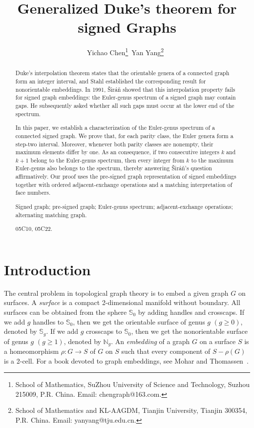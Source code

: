 \documentclass[12pt]{article}
\theoremstyle{definition}
\begin{document}
\title{Generalized Duke's theorem for signed Graphs}

\author{Yichao Chen\thanks{School of Mathematics, SuZhou University of Science and Technology, Suzhou 215009, P.R. China. Email: chengraph@163.com.}\,
\qquad
Yan Yang\thanks{School of Mathematics and KL-AAGDM, Tianjin University, Tianjin 300354, P.R. China. Email: yanyang@tju.edu.cn.} \,}

\date{}

\maketitle

 \begin{abstract}
Duke's interpolation theorem states that the orientable genera of a connected graph form an integer interval, and Stahl established the corresponding result for nonorientable embeddings. In 1991, \v{S}ir\'a\v{n} showed that this interpolation property fails for signed graph embeddings: the Euler-genus spectrum of a signed graph may contain gaps. He subsequently asked whether all such gaps must occur at the lower end of the spectrum.

In this paper, we establish a   characterization of the Euler-genus spectrum of a connected signed graph. We prove that, for each parity class, the Euler genera form a step-two interval. Moreover, whenever both parity classes are nonempty, their maximum elements differ by one. As an  consequence, if two consecutive integers $k$ and $k+1$ belong to the Euler-genus spectrum, then every integer from $k$ to the maximum Euler-genus also belongs to the spectrum, thereby answering \v{S}ir\'a\v{n}'s question affirmatively. Our proof uses the pre-signed graph representation of signed embeddings together with ordered adjacent-exchange operations and a matching interpretation of face numbers.



\medskip
{} Signed graph; pre-signed graph; Euler-genus spectrum; adjacent-exchange operations; alternating matching graph.

\smallskip
{} 05C10, 05C22.
\end{abstract}



\section{Introduction}
The central problem in topological graph theory is to embed a given graph $G$ on surfaces. A {\it surface} is a compact 2-dimensional manifold without boundary. All surfaces can be obtained from the sphere $\mathbb{S}_0$ by adding handles and crosscaps. If we add $g$ handles to $\mathbb{S}_0$, then we get the orientable surface of genus $g$ $(g\geq 0)$, denoted by $\mathbb{S}_g$. If we add $g$ crosscaps to $\mathbb{S}_0$, then we get the nonorientable surface of genus $g$ $(g\geq 1)$, denoted by $\mathbb{N}_g$. An {\it embedding} of a graph $G$ on a surface $S$ is a homeomorphism $\rho: G\rightarrow S$ of $G$ on $S$ such that every component of $S-\rho(G)$ is a 2-cell.
For a book devoted to graph embeddings, see Mohar and Thomassen~\cite{MT01}.
\end{document}
